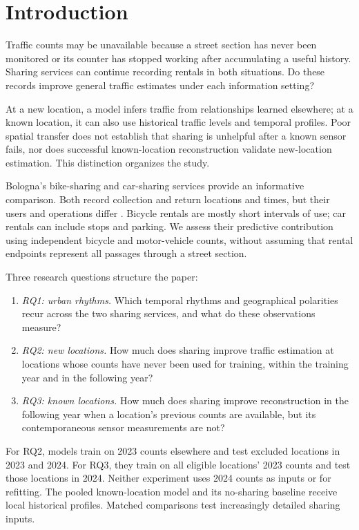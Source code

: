 \documentclass[]{interact}
\begin{document}
\section{Introduction}
Traffic counts may be unavailable because a street section has never been monitored or its counter has stopped working after accumulating a useful history. Sharing services can continue recording rentals in both situations. Do these records improve general traffic estimates under each information setting?

At a new location, a model infers traffic from relationships learned elsewhere; at a known location, it can also use historical traffic levels and temporal profiles. Poor spatial transfer does not establish that sharing is unhelpful after a known sensor fails, nor does successful known-location reconstruction validate new-location estimation. This distinction organizes the study.

Bologna's bike-sharing and car-sharing services provide an informative comparison. Both record collection and return locations and times, but their users and operations differ \citep{fishman2016,jorge2013}. Bicycle rentals are mostly short intervals of use; car rentals can include stops and parking. We assess their predictive contribution using independent bicycle and motor-vehicle counts, without assuming that rental endpoints represent all passages through a street section.

Three research questions structure the paper:
\begin{enumerate}
\item \emph{RQ1: urban rhythms.} Which temporal rhythms and geographical polarities recur across the two sharing services, and what do these observations measure?
\item \emph{RQ2: new locations.} How much does sharing improve traffic estimation at locations whose counts have never been used for training, within the training year and in the following year?
\item \emph{RQ3: known locations.} How much does sharing improve reconstruction in the following year when a location's previous counts are available, but its contemporaneous sensor measurements are not?
\end{enumerate}

For RQ2, models train on 2023 counts elsewhere and test excluded locations in 2023 and 2024. For RQ3, they train on all eligible locations' 2023 counts and test those locations in 2024. Neither experiment uses 2024 counts as inputs or for refitting. The pooled known-location model and its no-sharing baseline receive local historical profiles. Matched comparisons test increasingly detailed sharing inputs.
\end{document}

